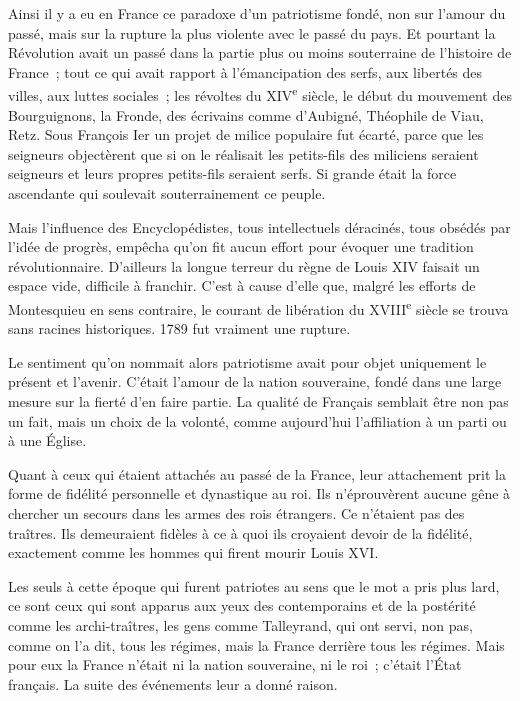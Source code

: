 \documentclass[french,twoside]{book} %
\begin{document}
Ainsi il y a eu en France ce paradoxe d'un patriotisme fondé, non sur l'amour du passé, mais sur la rupture la plus violente avec le passé du pays. Et pourtant la Révolution avait un passé dans la partie plus ou moins souterraine de l'histoire de France ; tout ce qui avait rapport à l'émancipation des serfs, aux libertés des villes, aux luttes sociales ; les révoltes du XIV\textsuperscript{e} siècle, le début du mouvement des Bourguignons, la Fronde, des écrivains comme d'Aubigné, Théophile de Viau, Retz. Sous François Ier un projet de milice populaire fut écarté, parce que les seigneurs objectèrent que si on le réalisait les petits-fils des miliciens seraient seigneurs et leurs propres petits-fils seraient serfs. Si grande était la force ascendante qui soulevait souterrainement ce peuple.\par
Mais l'influence des Encyclopédistes, tous intellectuels déracinés, tous obsédés par l'idée de progrès, empêcha qu'on fit aucun effort pour évoquer une tradition révolutionnaire. D'ailleurs la longue terreur du règne de Louis XIV faisait un espace vide, difficile à franchir. C'est à cause d'elle que, malgré les efforts de Montesquieu en sens contraire, le courant de libération du XVIII\textsuperscript{e} siècle se trouva sans racines historiques. 1789 fut vraiment une rupture.\par
Le sentiment qu'on nommait alors patriotisme avait pour objet uniquement le présent et l'avenir. C'était l'amour de la nation souveraine, fondé dans une large mesure sur la fierté d'en faire partie. La qualité de Français semblait être non pas un fait, mais un choix de la volonté, comme aujourd'hui l'affiliation à un parti ou à une Église.\par
Quant à ceux qui étaient attachés au passé de la France, leur attachement prit la forme de fidélité personnelle et dynastique au roi. Ils n'éprouvèrent aucune gêne à chercher un secours dans les armes des rois étrangers. Ce n'étaient pas des traîtres. Ils demeuraient fidèles à ce à quoi ils croyaient devoir de la fidélité, exactement comme les hommes qui firent mourir Louis XVI.\par
Les seuls à cette époque qui furent patriotes au sens que le mot a pris plus lard, ce sont ceux qui sont apparus aux yeux des contemporains et de la postérité comme les archi-traîtres, les gens comme Talleyrand, qui ont servi, non pas, comme on l'a dit, tous les régimes, mais la France derrière tous les régimes. Mais pour eux la France n'était ni la nation souveraine, ni le roi ; c'était l'État français. La suite des événements leur a donné raison.\par
\end{document}
